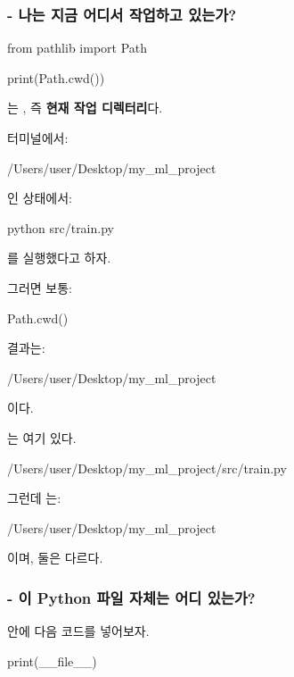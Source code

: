 \subsubsection{ - 나는 지금 어디서 작업하고 있는가?}

\begin{dhkcode}
from pathlib import Path

print(Path.cwd())
\end{dhkcode}

는 , 즉 \textbf{현재 작업 디렉터리}다.

터미널에서:

\begin{dhkzsh}
/Users/user/Desktop/my_ml_project %
\end{dhkzsh}

인 상태에서:

\begin{dhkzsh}
python src/train.py
\end{dhkzsh}

를 실행했다고 하자.

그러면 보통:

\begin{dhkcode}
Path.cwd()
\end{dhkcode}

결과는:

\begin{dhkzsh}
/Users/user/Desktop/my_ml_project
\end{dhkzsh}

이다.

는 여기 있다.

\begin{dhkzsh}
/Users/user/Desktop/my_ml_project/src/train.py
\end{dhkzsh}

그런데 는:

\begin{dhkzsh}
/Users/user/Desktop/my_ml_project
\end{dhkzsh}

이며, 둘은 다르다.

\subsubsection{ - 이 Python 파일 자체는 어디 있는가?}

안에 다음 코드를 넣어보자.

\begin{dhkcode}
print(__file__)
\end{dhkcode}

